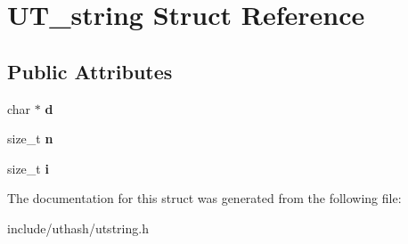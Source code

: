 \hypertarget{struct_u_t__string}{}\section{U\+T\+\_\+string Struct Reference}
\label{struct_u_t__string}
\subsection*{Public Attributes}
\begin{DoxyCompactItemize}
\item 
\mbox{\label{struct_u_t__string_ae8062f7fa4067676e9d74ca2b2923ff9}} 
char $\ast$ {\bfseries d}
\item 
\mbox{\label{struct_u_t__string_a85161591fe87dd4be9cc031e282ffc1f}} 
size\+\_\+t {\bfseries n}
\item 
\mbox{\label{struct_u_t__string_aa78df8b7c6db840e406431e5cb8941be}} 
size\+\_\+t {\bfseries i}
\end{DoxyCompactItemize}


The documentation for this struct was generated from the following file\+:\begin{DoxyCompactItemize}
\item 
include/uthash/utstring.\+h\end{DoxyCompactItemize}
